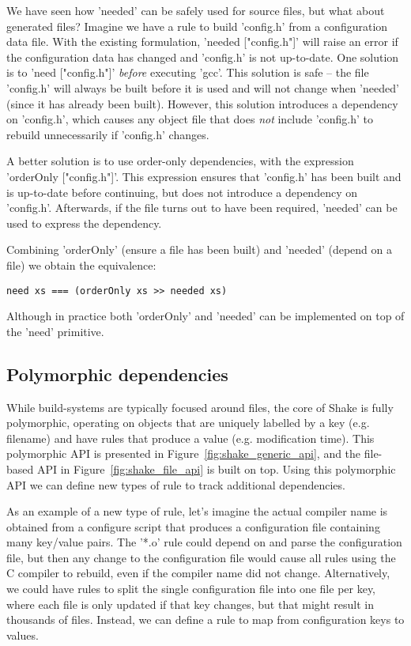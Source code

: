 We have seen how \lst'needed' can be safely used for source files, but what about generated files? Imagine we have a rule to build \lst'config.h' from a configuration data file. With the existing formulation, \lst'needed ["config.h"]' will raise an error if the configuration data has changed and \lst'config.h' is not up-to-date. One solution is to \lst'need ["config.h"]' \emph{before} executing \lst'gcc'. This solution is safe -- the file \lst'config.h' will always be built before it is used and will not change when \lst'needed' (since it has already been built). However, this solution introduces a dependency on \lst'config.h', which causes any object file that does \emph{not} include \lst'config.h' to rebuild unnecessarily if \lst'config.h' changes.

A better solution is to use order-only dependencies, with the expression \lst'orderOnly ["config.h"]'. This expression ensures that \lst'config.h' has been built and is up-to-date before continuing, but does not introduce a dependency on \lst'config.h'. Afterwards, if the file turns out to have been required, \lst'needed' can be used to express the dependency.

Combining \lst'orderOnly' (ensure a file has been built) and \lst'needed' (depend on a file) we obtain the equivalence:

\begin{lstlisting}
need xs === (orderOnly xs >> needed xs)
\end{lstlisting}

\noindent Although in practice both \lst'orderOnly' and \lst'needed' can be implemented on top of the \lst'need' primitive.

\subsection{Polymorphic dependencies\label{sec:polymorphic}}

While build-systems are typically focused around files, the core of Shake is fully polymorphic, operating on objects that are uniquely labelled by a key (e.g. filename) and have rules that produce a value (e.g. modification time). This polymorphic API is presented in Figure~\ref{fig:shake_generic_api}, and the file-based API in Figure~\ref{fig:shake_file_api} is built on top. Using this polymorphic API we can define new types of rule to track additional dependencies.

As an example of a new type of rule, let's imagine the actual compiler name is obtained from a configure script that produces a configuration file containing many key/value pairs. The \lst'*.o' rule could depend on and parse the configuration file, but then any change to the configuration file would cause all rules using the C compiler to rebuild, even if the compiler name did not change. Alternatively, we could have rules to split the single configuration file into one file per key, where each file is only updated if that key changes, but that might result in thousands of files. Instead, we can define a rule to map from configuration keys to values.

